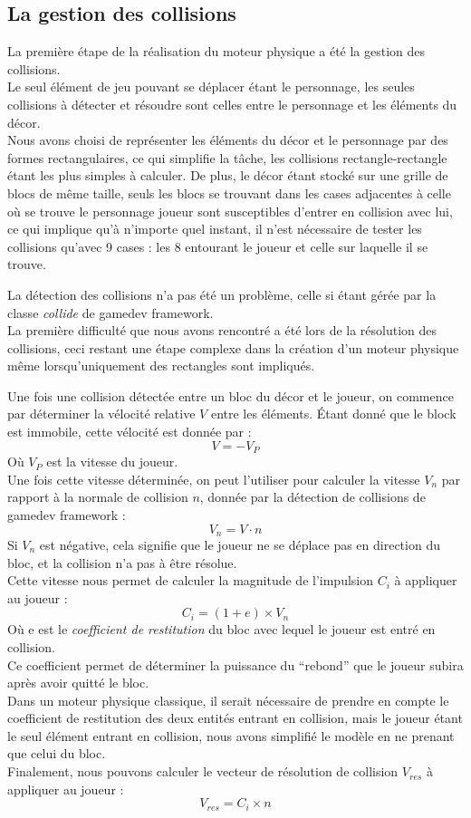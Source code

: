 \documentclass[10pt]{report}
\begin{document}
\subsection{La gestion des collisions} \label{physique:collisions}
La première étape de la réalisation du moteur physique a été la gestion des collisions.\\
Le seul élément de jeu pouvant se déplacer étant le personnage, les seules collisions à détecter et résoudre sont
celles entre le personnage et les éléments du décor.\\
Nous avons choisi de représenter les éléments du décor et le personnage par des formes rectangulaires,
ce qui simplifie la tâche, les collisions rectangle-rectangle étant les plus simples à calculer.
De plus, le décor étant stocké sur une grille de blocs de même taille, seuls les blocs se trouvant dans les cases
adjacentes à celle où se trouve le personnage joueur sont susceptibles d'entrer en collision avec lui,
ce qui implique qu'à n'importe quel instant, il n'est nécessaire de tester les collisions qu'avec 9 cases :
les 8 entourant le joueur et celle sur laquelle il se trouve.

La détection des collisions n'a pas été un problème, celle si étant gérée par
la classe \emph{collide} de gamedev framework.\\
La première difficulté que nous avons rencontré a été lors de la résolution des collisions,
ceci restant une étape complexe dans la création d'un moteur physique même lorsqu'uniquement
des rectangles sont impliqués.

Une fois une collision détectée entre un bloc du décor et le joueur, on commence par déterminer la
vélocité relative \(V\) entre les éléments.
Étant donné que le block est immobile, cette vélocité est donnée par :
\[ V =  - V_{P} \]
Où \(V_{P}\) est la vitesse du joueur.\\
Une fois cette vitesse déterminée, on peut l'utiliser pour calculer la vitesse \(V_{n}\) par rapport à la
normale de collision \(n\), donnée par la détection de collisions de gamedev framework :
\[ V_{n} = V \cdot n \]
Si \(V_{n}\) est négative, cela signifie que le joueur ne se déplace pas en direction du bloc,
et la collision n'a pas à être résolue.\\
Cette vitesse nous permet de calculer la magnitude de l'impulsion \(C_{i}\) à appliquer au joueur :\\
\[ C_{i} = (1 + e) \times V_{n} \]
Où e est le \emph{coefficient de restitution} du bloc avec lequel le joueur est entré en collision.\\
Ce coefficient permet de déterminer la puissance du ``rebond'' que le joueur subira après avoir quitté le bloc.\\
Dans un moteur physique classique, il serait nécessaire de prendre en compte le coefficient de restitution des
deux entités entrant en collision, mais le joueur étant le seul élément entrant en collision,
nous avons simplifié le modèle en ne prenant que celui du bloc.\\
Finalement, nous pouvons calculer le vecteur de résolution de collision \(V_{res}\) à appliquer au joueur :
\[V_{res} = C_{i} \times n \]
\end{document}
